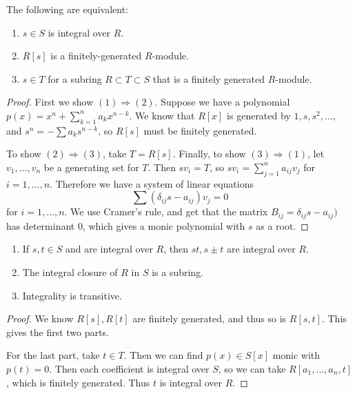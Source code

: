 \documentclass[10pt, twoside]{article}
\begin{document}
        \begin{prop}
            The following are equivalent:
            \begin{enumerate}
                \item $s \in S$ is integral over $R$.
                \item $R[s]$ is a finitely-generated $R$-module.
                \item $s \in T$ for a subring $R \subset T \subset S$ that is a finitely generated $R$-module.
            \end{enumerate}
            \begin{proof}
                First we show $(1) \Rightarrow (2)$. Suppose we have a polynomial $p(x) = x^n + \sum_{k=1}^n a_kx^{n-k}$. We know that $R[x]$ is generated by $1,s,s^2, \ldots,$ and $s^n = - \sum a_k s^{n-k}$, so $R[s]$ must be finitely generated.

                To show $(2) \Rightarrow (3)$, take $T = R[s]$. Finally, to show $(3) \Rightarrow (1)$, let $v_1, \ldots, v_n$ be a generating set for $T$. Then $sv_i = T$, so $sv_i = \sum_{j=1}^n a_{ij}v_j$ for $i = 1, \ldots, n$. Therefore we have a system of linear equations \[\sum (\delta_{ij}s - a_{ij}) v_j = 0 \] for $i = 1, \ldots, n$. We use Cramer's rule, and get that the matrix $B_{ij} = \delta_{ij}s - a_{ij})$ has determinant $0$, which gives a monic polynomial with $s$ as a root.
            \end{proof}
        \end{prop}

        \begin{cor}
            \begin{enumerate}
                \item If $s,t \in S$ and are integral over $R$, then $st,s\pm t$ are integral over $R$.
                \item The integral closure of $R$ in $S$ is a subring.
                \item Integrality is transitive.
            \end{enumerate}
            \begin{proof}
                We know $R[s],R[t]$ are finitely generated, and thus so is $R[s,t]$. This gives the first two parts.

                For the last part, take $t \in T$. Then we can find $p(x) \in S[x]$ monic with $p(t) = 0$. Then each coefficient is integral over $S$, so we can take $R[a_1, \ldots, a_n,t]$, which is finitely generated. Thus $t$ is integral over $R$.
            \end{proof}
        \end{cor}
\end{document}
